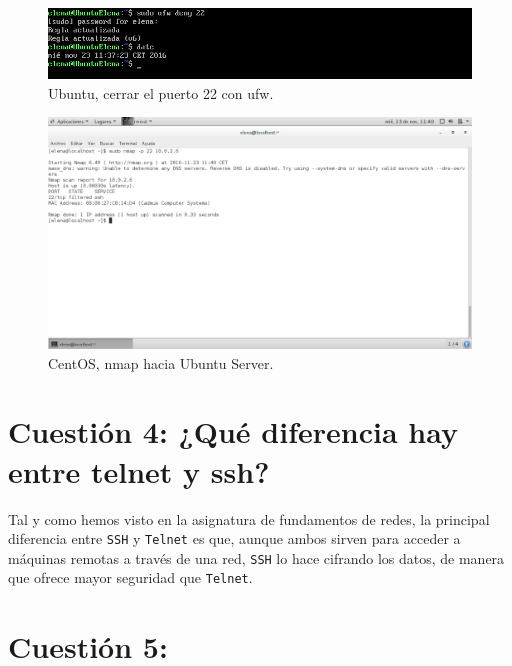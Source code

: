 \begin{figure}[H] 
	\centering
	\includegraphics[width=15cm]{./img/ejercicio3c4.png} 	
	\caption{Ubuntu, cerrar el puerto 22 con ufw.} \label{fig:ejercicio3c4}
\end{figure}

\begin{figure}[H] 
	\centering
	\includegraphics[width=15cm]{./img/ejercicio3c5.png} 	
	\caption{CentOS, nmap hacia Ubuntu Server.} \label{fig:ejercicio3c5}
\end{figure}



\section{Cuestión 4: ¿Qué diferencia hay entre telnet y ssh?}
Tal y como hemos visto en la asignatura de fundamentos de redes, la principal diferencia entre \texttt{SSH} y \texttt{Telnet} es que,   aunque ambos sirven para acceder a máquinas remotas a través de una red, \texttt{SSH} lo hace cifrando los datos, de manera que ofrece  mayor seguridad que \texttt{Telnet}.



\section{Cuestión 5:}

